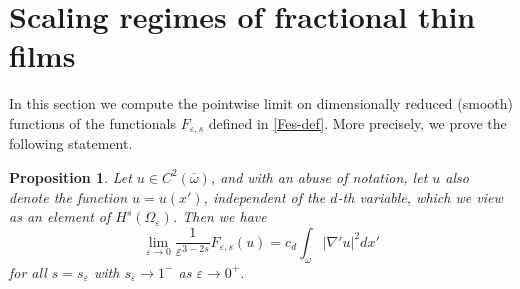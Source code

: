 \documentclass{article}
\newtheorem{proposition}[lemma]{Proposition}
\newcommand{\e}{\varepsilon}
\begin{document}
\section{Scaling regimes of fractional thin films}
In this section we compute the pointwise limit on dimensionally reduced (smooth) functions of the functionals $F_{\e,s}$ defined in \eqref{Fes-def}. More precisely, we prove the following statement.

\begin{proposition}\label{limsupc2} Let $u\in C^2(\overline\omega)$, and with an abuse of notation, let $u$ also denote the function $u=u(x')$, independent of the $d$-th variable, which we view as an element of  $H^s(\Omega_\e)$. Then we have
\begin{equation}
\lim_{\e\to 0} \frac{1}{\e^{3-2s}}F_{\e,s}(u)= c_d\int_\omega |\nabla'u|^2dx'
\end{equation}
for all $s=s_\e$ with $s_\e\to 1^-$ as $\e\to 0^+$.
\end{proposition}
\end{document}
